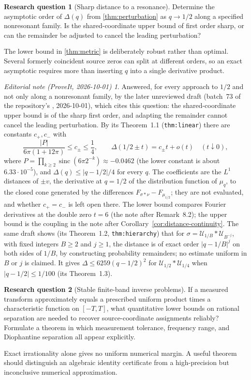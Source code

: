 \documentclass[11pt,letterpaper]{article}
\theoremstyle{definition}
\newtheorem{question}{Research question}
\theoremstyle{remark}
\newtheorem*{ednotelater}{Editorial note (ProveIt, 2026-10-01)}
\newcommand{\Un}{\mathcal U}
\newcommand{\sinc}{\operatorname{sinc}}
\numberwithin{equation}{section}
\begin{document}
\begin{question}[Sharp distance to a resonance]
Determine the asymptotic order of $\Delta(q)$ from \cref{thm:perturbation} as $q\to1/2$ along a specified nonresonant family. Is the shared-coordinate upper bound of first order sharp, or can the remainder be adjusted to cancel the leading perturbation?
\end{question}
The lower bound in \cref{thm:metric} is deliberately robust rather than optimal. Several formerly coincident source zeros can split at different orders, so an exact asymptotic requires more than inserting $q$ into a single derivative product.
\begin{ednotelater}
Answered, for every approach to $1/2$ and not only along a nonresonant
family, by the later unreviewed draft
(batch~73 of the repository's , 2026-10-01), which
cites this question: the shared-coordinate upper bound is of the sharp
first order, and adapting the remainder cannot cancel the leading
perturbation. By its Theorem~1.1 (\texttt{thm:linear}) there are
constants $c_+,c_-$ with
\[
 \frac{|P|}{6\pi(1+12\pi)}\le c_\pm\le\frac14,\qquad
 \Delta(1/2\pm t)=c_\pm t+o(t)\quad(t\downarrow0),
\]
where $P=\prod_{k\ge2}\sinc(6\pi2^{-k})\approx-0.0462$ (the lower
constant is about $6.33\cdot10^{-5}$), and $\Delta(q)\le|q-1/2|/4$ for
every $q$. The coefficients are the $L^1$ distances of $\pm v$, the
derivative at $q=1/2$ of the distribution function of $\mu_q$, to the
closed cone generated by the differences $F_{\sigma*\nu}-F_{\mu_{1/2}}$;
they are not evaluated, and whether $c_+=c_-$ is left open there. The
lower bound compares Fourier derivatives at the double zero $t=6$ (the
note after Remark~8.2); the upper bound is the coupling in the note after
Corollary~\ref{cor:distance-continuity}. The same draft shows (its Theorem~1.2,
\texttt{thm:hierarchy}) that for $\sigma=\Un_{1/B}*\Un_{B^{-j}}$, with
fixed integers $B\ge2$ and $j\ge1$, the distance is of exact order
$|q-1/B|^j$ on both sides of $1/B$, by constructing probability
remainders; no estimate uniform in $B$ or $j$ is claimed. It gives
$\Delta\le6259(q-1/2)^2$ for $\Un_{1/2}*\Un_{1/4}$ when
$|q-1/2|\le1/100$ (its Theorem~1.3).
\end{ednotelater}

\begin{question}[Stable finite-band inverse problems]
If a measured transform approximately equals a prescribed uniform product times a characteristic function on $[-T,T]$, what quantitative lower bounds on rational separation are needed to recover source-coordinate assignments reliably? Formulate a theorem in which measurement tolerance, frequency range, and Diophantine separation all appear explicitly.
\end{question}
Exact irrationality alone gives no uniform numerical margin. A useful theorem should distinguish an algebraic identity certificate from a high-precision but inconclusive numerical approximation.
\end{document}
